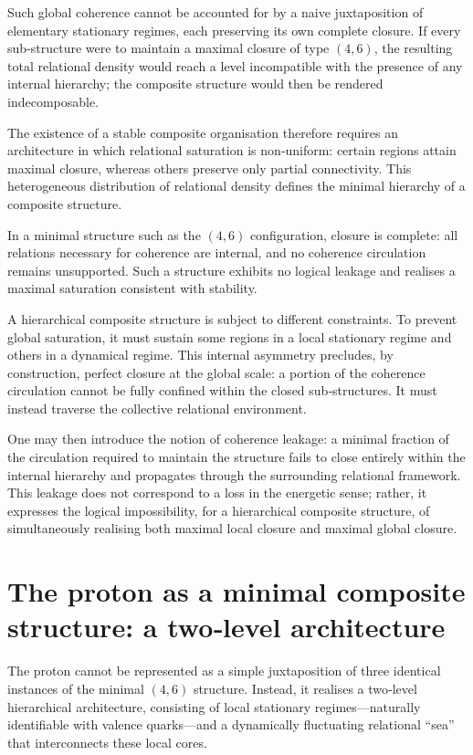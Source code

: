 \documentclass[11pt,a4paper]{article}
\begin{document}
Such global coherence cannot be accounted for by a naive juxtaposition of elementary stationary regimes, each preserving its own complete closure. If every sub‑structure were to maintain a maximal closure of type \((4,6)\), the resulting total relational density would reach a level incompatible with the presence of any internal hierarchy; the composite structure would then be rendered indecomposable. 

The existence of a stable composite organisation therefore requires an architecture in which relational saturation is non‑uniform: certain regions attain maximal closure, whereas others preserve only partial connectivity. This heterogeneous distribution of relational density defines the minimal hierarchy of a composite structure. 

In a minimal structure such as the \((4,6)\) configuration, closure is complete: all relations necessary for coherence are internal, and no coherence circulation remains unsupported. Such a structure exhibits no logical leakage and realises a maximal saturation consistent with stability. 

A hierarchical composite structure is subject to different constraints. To prevent global saturation, it must sustain some regions in a local stationary regime and others in a dynamical regime. This internal asymmetry precludes, by construction, perfect closure at the global scale: a portion of the coherence circulation cannot be fully confined within the closed sub‑structures. It must instead traverse the collective relational environment. 

One may then introduce the notion of coherence leakage: a minimal fraction of the circulation required to maintain the structure fails to close entirely within the internal hierarchy and propagates through the surrounding relational framework. This leakage does not correspond to a loss in the energetic sense; rather, it expresses the logical impossibility, for a hierarchical composite structure, of simultaneously realising both maximal local closure and maximal global closure.

\section{The proton as a minimal composite structure: a two‑level architecture}
The proton cannot be represented as a simple juxtaposition of three identical instances of the minimal \((4,6)\) structure. Instead, it realises a two‑level hierarchical architecture, consisting of local stationary regimes—naturally identifiable with valence quarks—and a dynamically fluctuating relational “sea” that interconnects these local cores. 
\end{document}
